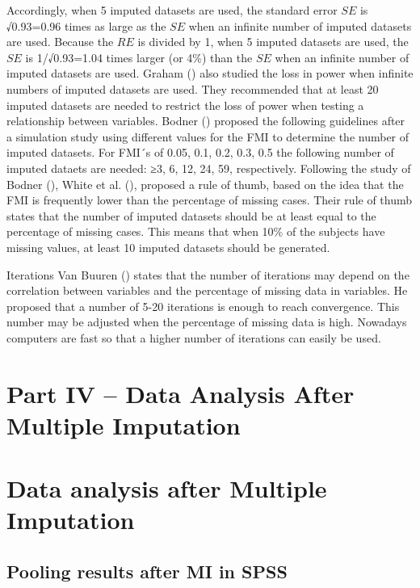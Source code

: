 \documentclass[]{book}
\begin{document}
Accordingly, when 5 imputed datasets are used, the standard error \(SE\)
is √0.93=0.96 times as large as the \(SE\) when an infinite number of
imputed datasets are used. Because the \(RE\) is divided by 1, when 5
imputed datasets are used, the \(SE\) is 1/√0.93=1.04 times larger (or
4\%) than the \(SE\) when an infinite number of imputed datasets are
used. Graham (\citet{Graham2007}) also studied the loss in power when
infinite numbers of imputed datasets are used. They recommended that at
least 20 imputed datasets are needed to restrict the loss of power when
testing a relationship between variables. Bodner (\citet{Bodner2008})
proposed the following guidelines after a simulation study using
different values for the FMI to determine the number of imputed
datasets. For FMI´s of 0.05, 0.1, 0.2, 0.3, 0.5 the following number of
imputed dataets are needed: ≥3, 6, 12, 24, 59, respectively. Following
the study of Bodner (\citet{Bodner2008}), White et al.
(\citet{White2011}), proposed a rule of thumb, based on the idea that
the FMI is frequently lower than the percentage of missing cases. Their
rule of thumb states that the number of imputed datasets should be at
least equal to the percentage of missing cases. This means that when
10\% of the subjects have missing values, at least 10 imputed datasets
should be generated.

Iterations Van Buuren (\citet{VanBuuren2012}) states that the number of
iterations may depend on the correlation between variables and the
percentage of missing data in variables. He proposed that a number of
5-20 iterations is enough to reach convergence. This number may be
adjusted when the percentage of missing data is high. Nowadays computers
are fast so that a higher number of iterations can easily be used.

\chapter*{Part IV -- Data Analysis After Multiple
Imputation}\label{part-iv-data-analysis-after-multiple-imputation}

\chapter{Data analysis after Multiple
Imputation}\label{data-analysis-after-multiple-imputation}

\section{Pooling results after MI in
SPSS}\label{pooling-results-after-mi-in-spss}
\end{document}
